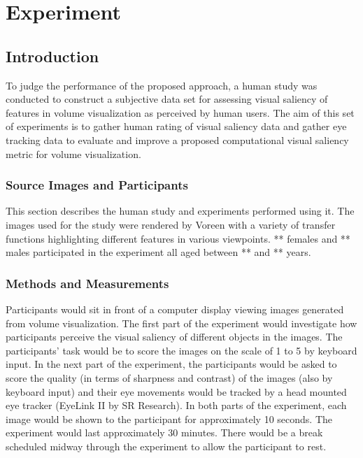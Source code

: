 \chapter{Experiment}

\section{Introduction}
To judge the performance of the proposed approach, a human study was conducted to construct a subjective data set for assessing visual saliency of features in volume visualization as perceived by human users. The aim of this set of experiments is to gather human rating of visual saliency data and gather eye tracking data to evaluate and improve a proposed computational visual saliency metric for volume visualization.

\subsection{Source Images and Participants}
This section describes the human study and experiments performed using it.
The images used for the study were rendered by Voreen \cite{meyer-spradow_voreen:_2009} with a variety of transfer functions highlighting different features in various viewpoints.
** females and ** males participated in the experiment all aged between ** and ** years.

\subsection{Methods and Measurements}
Participants would sit in front of a computer display viewing images generated from volume visualization. The first part of the experiment would investigate how participants perceive the visual saliency of different objects in the images. The participants’ task would be to score the images on the scale of 1 to 5 by keyboard input. In the next part of the experiment, the participants would be asked to score the quality (in terms of sharpness and contrast) of the images (also by keyboard input) and their eye movements would be tracked by a head mounted eye tracker (EyeLink II by SR Research). In both parts of the experiment, each image would be shown to the participant for approximately 10 seconds. The experiment would last approximately 30 minutes. There would be a break scheduled midway through the experiment to allow the participant to rest.


